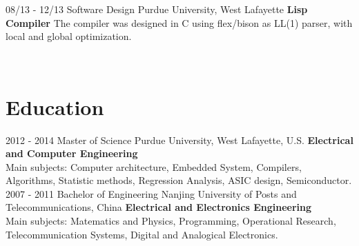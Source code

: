\documentclass[]{friggeri-cv}
\begin{document}
\begin{entrylist}
  \entry
  	{08/13 - 12/13}
  	{Software Design}
  	{Purdue University, West Lafayette}
  	{\textbf{Lisp Compiler} The compiler was designed in C using flex/bison as LL(1) parser, with local and global optimization.\\} 
\end{entrylist}
~
~
~
\section{Education}
\begin{entrylist}
  \entry
    {2012 - 2014}
    {Master of Science}
    {Purdue University, West Lafayette, U.S.}
    {\textbf{Electrical and Computer Engineering\\}
Main subjects: Computer architecture, Embedded System, Compilers, Algorithms, Statistic methods, Regression Analysis, ASIC design, Semiconductor.\\}
  \entry
    {2007 - 2011}
    {Bachelor of Engineering}
    {Nanjing University of Posts and Telecommunications, China}
    {\textbf{Electrical and Electronics Engineering\\}
Main subjects: Matematics and Physics, Programming, Operational Research, Telecommunication Systems, Digital and Analogical Electronics.\\}

\end{entrylist}

\end{document}
